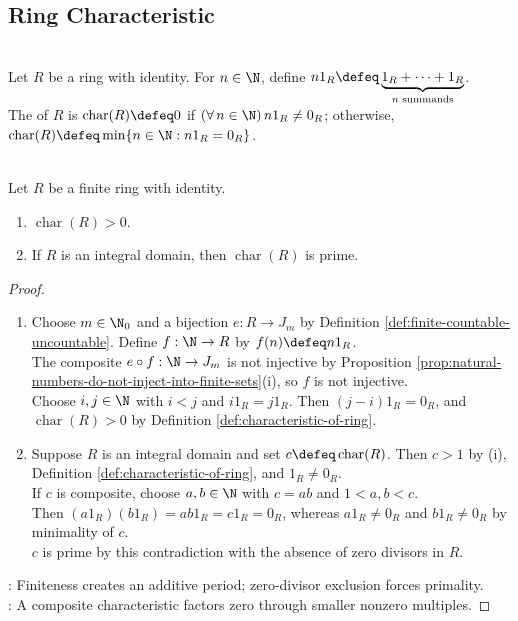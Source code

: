 \subsection{Ring Characteristic}

\begin{definition} \label{def:characteristic-of-ring} \\
Let $R$ be a ring with identity. For $n\in\N$, define $n1_R\defeq\underbrace{1_R+\cdots+1_R}_{n\text{ summands}}$.\\
The  of $R$ is $\operatorname{char}(R)\defeq0$ if $(\forall\,n\in\N)\,n1_R\neq0_R$; otherwise, $\operatorname{char}(R)\defeq\min\{n\in\N:n1_R=0_R\}$.
\end{definition}

\begin{proposition} \label{prop:finite-domain-prime-characteristic} \\
Let $R$ be a finite ring with identity.
\begin{enumerate}[label=(\roman*)]
\setlength{\itemsep}{0pt}
\item $\operatorname{char}(R)>0$.
\item If $R$ is an integral domain, then $\operatorname{char}(R)$ is prime.
\end{enumerate}
\begin{proof}
\begin{enumerate}[label=(\roman*)]
\setlength{\itemsep}{0pt}
\item Choose $m\in\N_0$ and a bijection $e:R\to J_m$ by Definition \ref{def:finite-countable-uncountable}. Define $f:\N\to R$ by $f(n)\defeq n1_R$.\\
The composite $e\circ f:\N\to J_m$ is not injective by Proposition \ref{prop:natural-numbers-do-not-inject-into-finite-sets}(i), so $f$ is not injective.\\
Choose $i,j\in\N$ with $i<j$ and $i1_R=j1_R$. Then $(j-i)1_R=0_R$, and $\operatorname{char}(R)>0$ by Definition \ref{def:characteristic-of-ring}.
\item Suppose $R$ is an integral domain and set $c\defeq\operatorname{char}(R)$. Then $c>1$ by (i), Definition \ref{def:characteristic-of-ring}, and $1_R\neq0_R$.\\
If $c$ is composite, choose $a,b\in\N$ with $c=ab$ and $1<a,b<c$.\\
Then $(a1_R)(b1_R)=ab1_R=c1_R=0_R$, whereas $a1_R\neq0_R$ and $b1_R\neq0_R$ by minimality of $c$.\\
$c$ is prime by this contradiction with the absence of zero divisors in $R$.
\end{enumerate}
: Finiteness creates an additive period; zero-divisor exclusion forces primality.\\
: A composite characteristic factors zero through smaller nonzero multiples.
\end{proof}
\end{proposition}
